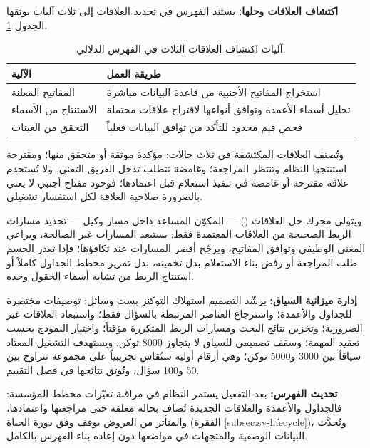 \textbf{اكتشاف العلاقات وحلها:} يستند الفهرس في تحديد العلاقات إلى ثلاث آليات يوثقها الجدول \ref{tab:sv-relations}.

\begin{table}[H]
\centering
\caption{آليات اكتشاف العلاقات الثلاث في الفهرس الدلالي.}
\label{tab:sv-relations}
\scriptsize
\renewcommand{\arraystretch}{1.35}
\begin{tabularx}{\textwidth}{|>{\raggedright\arraybackslash}p{3.2cm}|>{\raggedright\arraybackslash}X|}
\hline
\textbf{الآلية} & \textbf{طريقة العمل} \\
\hline
المفاتيح المعلنة & استخراج المفاتيح الأجنبية من قاعدة البيانات مباشرة \\
\hline
الاستنتاج من الأسماء & تحليل أسماء الأعمدة وتوافق أنواعها لاقتراح علاقات محتملة \\
\hline
التحقق من العينات & فحص قيم محدود للتأكد من توافق البيانات فعلياً \\
\hline
\end{tabularx}
\end{table}

وتُصنف العلاقات المكتشفة في ثلاث حالات: مؤكدة موثقة أو متحقق منها؛ ومقترحة استنتجها النظام وتنتظر المراجعة؛ وغامضة تتطلب تدخل الفريق التقني. ولا تُستخدم علاقة مقترحة أو غامضة في تنفيذ استعلام قبل اعتمادها؛ فوجود مفتاح أجنبي لا يعني بالضرورة صلاحية العلاقة لكل استفسار تشغيلي.

ويتولى محرك حل العلاقات () — المكوّن المساعد داخل مسار وكيل  — تحديد مسارات الربط الصحيحة من العلاقات المعتمدة فقط: يستبعد المسارات غير الصالحة، ويراعي المعنى الوظيفي وتوافق المفاتيح، ويرجّح أقصر المسارات عند تكافؤها؛ فإذا تعذر الحسم طلب المراجعة أو رفض بناء الاستعلام بدل تخمينه، بدل تمرير مخطط الجداول كاملاً أو استنتاج الربط من تشابه أسماء الحقول وحده.

\textbf{إدارة ميزانية السياق:} يرشّد التصميم استهلاك التوكنز بست وسائل: توصيفات مختصرة للجداول والأعمدة؛ واسترجاع العناصر المرتبطة بالسؤال فقط؛ واستبعاد العلاقات غير الضرورية؛ وتخزين نتائج البحث ومسارات الربط المتكررة مؤقتاً؛ واختيار النموذج بحسب تعقيد المهمة؛ وسقف تصميمي للسياق لا يتجاوز 8000 توكن. ويستهدف التشغيل المعتاد سياقاً بين 3000 و5000 توكن؛ وهي أرقام أولية ستُقاس تجريبياً على مجموعة تتراوح بين 50 و100 سؤال، وتُوثق نتائجها في فصل التقييم.

\textbf{تحديث الفهرس:} بعد التفعيل يستمر النظام في مراقبة تغيّرات مخطط المؤسسة: فالجداول والأعمدة والعلاقات الجديدة تُضاف بحالة معلقة حتى مراجعتها واعتمادها، والمتأثر من العروض يوقف وفق دورة الحياة (الفقرة \ref{subsec:sv-lifecycle})، وتُحدَّث البيانات الوصفية والمتجهات في مواضعها دون إعادة بناء الفهرس بالكامل.

